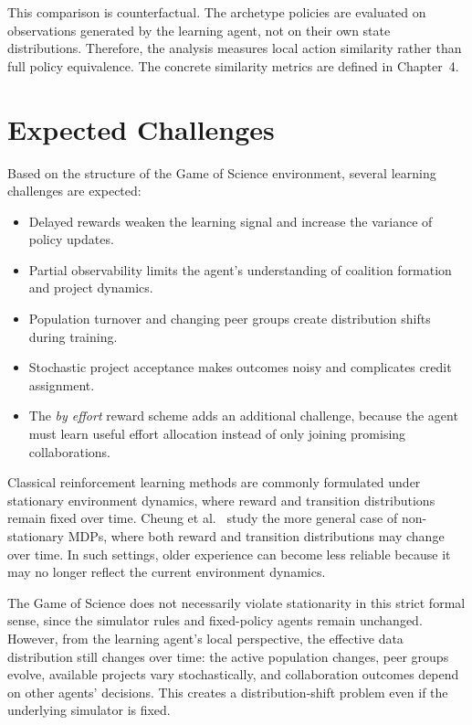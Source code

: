 \documentclass[english,bachelor]{hsluthesis}
\begin{document}
This comparison is counterfactual. The archetype policies are evaluated on observations generated by the learning agent, not on their own state distributions. Therefore, the analysis measures local action similarity rather than full policy equivalence. The concrete similarity metrics are defined in Chapter~4.

\section{Expected Challenges}

Based on the structure of the Game of Science environment, several learning challenges are expected:

\begin{itemize}
    \item Delayed rewards weaken the learning signal and increase the variance of policy updates.
    \item Partial observability limits the agent's understanding of coalition formation and project dynamics.
    \item Population turnover and changing peer groups create distribution shifts during training.
    \item Stochastic project acceptance makes outcomes noisy and complicates credit assignment.
    \item The \textit{by effort} reward scheme adds an additional challenge, because the agent must learn useful effort allocation instead of only joining promising collaborations.
\end{itemize}

Classical reinforcement learning methods are commonly formulated under stationary environment dynamics, where reward and transition distributions remain fixed over time. Cheung et al.~\cite{pmlr-v119-cheung20a} study the more general case of non-stationary MDPs, where both reward and transition distributions may change over time. In such settings, older experience can become less reliable because it may no longer reflect the current environment dynamics.

The Game of Science does not necessarily violate stationarity in this strict formal sense, since the simulator rules and fixed-policy agents remain unchanged. However, from the learning agent's local perspective, the effective data distribution still changes over time: the active population changes, peer groups evolve, available projects vary stochastically, and collaboration outcomes depend on other agents' decisions. This creates a distribution-shift problem even if the underlying simulator is fixed.
\end{document}
